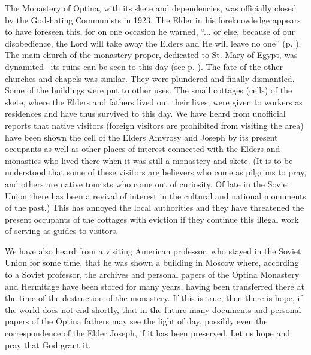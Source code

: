 The Monastery of Optina, with its skete and dependencies, was officially closed by the God-hating Communists in 1923. The Elder in his foreknowledge appears to have foreseen this, for on one occasion he warned, ``... or else, because of our disobedience, the Lord will take away the Elders and He will leave no one'' (p. \pageref{ch5obedience}). The main church of the monastery proper, dedicated to St. Mary of Egypt, was dynamited --its ruins can be seen to this day (see p. \pageref{saint-mary}). The fate of the other churches and chapels was similar. They were plundered and finally dismantled. Some of the buildings were put to other uses. The small cottages (cells) of the skete, where the Elders and fathers lived out their lives, were given to workers as residences and have thus survived to this day. We have heard from unofficial reports that native visitors (foreign visitors are prohibited from visiting the area) have been shown the cell of the Elders Amvrosy and Joseph by its present occupants as well as other places of interest connected with the Elders and monastics who lived there when it was still a monastery and skete. (It is to be understood that some of these visitors are believers who come as pilgrims to pray, and others are native tourists who come out of curiosity. Of late in the Soviet Union there has been a revival of interest in the cultural and national monuments of the past.) This has annoyed the local authorities and they have threatened the present occupants of the cottages with eviction if they continue this illegal work of serving as guides to visitors.

We have also heard from a visiting American professor, who stayed in the Soviet Union for some time, that he was shown a building in Moscow where, according to a Soviet professor, the archives and personal papers of the Optina Monastery and Hermitage have been stored for many years, having been transferred there at the time of the destruction of the monastery. If this is true, then there is hope, if the world does not end shortly, that in the future many documents and personal papers of the Optina fathers may see the light of day, possibly even the correspondence of the Elder Joseph, if it has been preserved. Let us hope and pray that God grant it.

